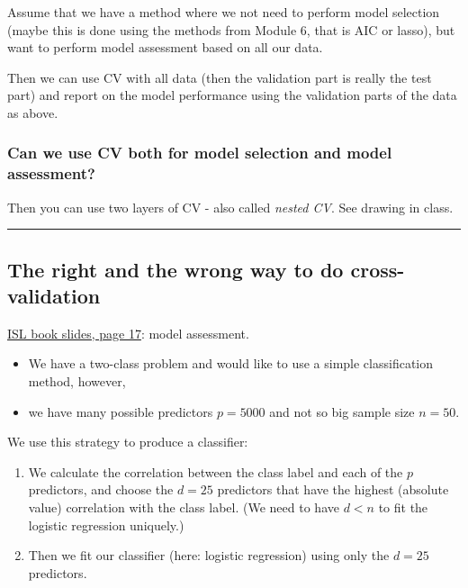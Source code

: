 \documentclass[]{article}
\providecommand{\tightlist}{%
  \setlength{\itemsep}{0pt}\setlength{\parskip}{0pt}}
\begin{document}
Assume that we have a method where we not need to perform model
selection (maybe this is done using the methods from Module 6, that is
AIC or lasso), but want to perform model assessment based on all our
data.

Then we can use CV with all data (then the validation part is really the
test part) and report on the model performance using the validation
parts of the data as above.

\hypertarget{can-we-use-cv-both-for-model-selection-and-model-assessment}{%
\subsubsection{Can we use CV both for model selection and model
assessment?}\label{can-we-use-cv-both-for-model-selection-and-model-assessment}}

Then you can use two layers of CV - also called \emph{nested CV}. See
drawing in class.

\begin{center}\rule{0.5\linewidth}{\linethickness}\end{center}

\hypertarget{the-right-and-the-wrong-way-to-do-cross-validation}{%
\subsection{The right and the wrong way to do
cross-validation}\label{the-right-and-the-wrong-way-to-do-cross-validation}}

\href{https://lagunita.stanford.edu/c4x/HumanitiesScience/StatLearning/asset/cv_boot.pdf}{ISL
book slides, page 17}: model assessment.

\begin{itemize}
\tightlist
\item
  We have a two-class problem and would like to use a simple
  classification method, however,
\item
  we have many possible predictors \(p=5000\) and not so big sample size
  \(n=50\).
\end{itemize}

We use this strategy to produce a classifier:

\begin{enumerate}
\def\labelenumi{\arabic{enumi}.}
\tightlist
\item
  We calculate the correlation between the class label and each of the
  \(p\) predictors, and choose the \(d=25\) predictors that have the
  highest (absolute value) correlation with the class label. (We need to
  have \(d<n\) to fit the logistic regression uniquely.)
\item
  Then we fit our classifier (here: logistic regression) using only the
  \(d=25\) predictors.
\end{enumerate}
\end{document}
